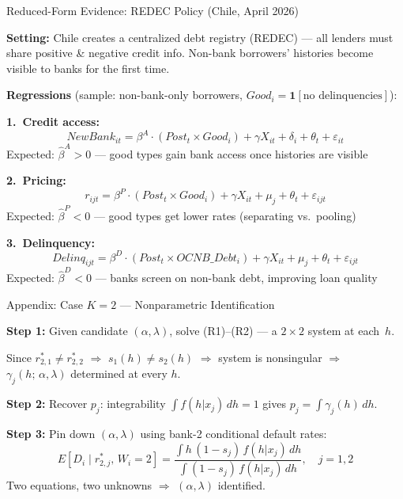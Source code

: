 \documentclass[10pt,aspectratio=169]{beamer}
\begin{document}
\begin{frame}{Reduced-Form Evidence: REDEC Policy (Chile, April 2026)}

\textbf{Setting:} Chile creates a centralized debt registry (REDEC) --- all lenders must share positive \& negative credit info.  Non-bank borrowers' histories become visible to banks for the first time.

\vspace{0.2cm}
\textbf{Regressions} (sample: non-bank-only borrowers, $Good_i = \mathbf{1}[\text{no delinquencies}]$):

\vspace{0.1cm}
\textbf{1.\ Credit access:}
$$NewBank_{it} = \beta^A \cdot (Post_t \times Good_i) + \gamma X_{it} + \delta_i + \theta_t + \varepsilon_{it}$$
Expected: $\hat{\beta}^A > 0$ --- good types gain bank access once histories are visible

\textbf{2.\ Pricing:}
$$r_{ijt} = \beta^P \cdot (Post_t \times Good_i) + \gamma X_{it} + \mu_j + \theta_t + \varepsilon_{ijt}$$
Expected: $\hat{\beta}^P < 0$ --- good types get lower rates (separating vs.\ pooling)

\textbf{3.\ Delinquency:}
$$Delinq_{ijt} = \beta^D \cdot (Post_t \times OCNB\_Debt_i) + \gamma X_{it} + \mu_j + \theta_t + \varepsilon_{ijt}$$
Expected: $\hat{\beta}^D < 0$ --- banks screen on non-bank debt, improving loan quality
\end{frame}


 
\begin{frame}{Appendix: Case $K = 2$ --- Nonparametric Identification}

\textbf{Step 1:} Given candidate $(\alpha, \lambda)$, solve (R1)--(R2) --- a $2 \times 2$ system at each~$h$.

Since $r_{2,1}^* \neq r_{2,2}^*$ $\Rightarrow$ $s_1(h) \neq s_2(h)$ $\Rightarrow$ system is nonsingular
$\Rightarrow$ $\gamma_j(h;\, \alpha, \lambda)$ determined at every $h$.

\vspace{0.2cm}
\textbf{Step 2:} Recover $p_j$: integrability $\int f(h|x_j)\, dh = 1$ gives $p_j = \int \gamma_j(h)\, dh$.

\vspace{0.2cm}
\textbf{Step 3:} Pin down $(\alpha, \lambda)$ using bank-2 conditional default rates:
$$E[D_i \mid r_{2,j}^*,\, W_i = 2] = \frac{\int h\,(1 - s_j)\, f(h|x_j)\, dh}{\int (1 - s_j)\, f(h|x_j)\, dh}, \quad j = 1, 2$$
Two equations, two unknowns $\Rightarrow$ $(\alpha, \lambda)$ identified.
\end{frame}
\end{document}
